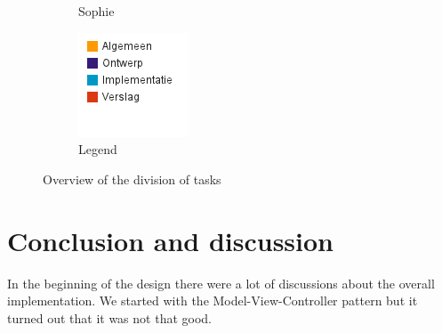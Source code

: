 \documentclass[i2]{oss}
\begin{document}
\begin{figure}[h!]
\begin{subfigure}[hb]{0.20\textwidth}
                \caption{Sophie}
        \end{subfigure}%
                \begin{subfigure}[hb]{0.20\textwidth}
                \centering
                \includegraphics[width=\textwidth]{legende}
                \caption{Legend}
        \end{subfigure}%


 \caption{Overview of the division of tasks}
\label{fig:werkverdeling}
\end{figure}





\section{Conclusion and discussion}
\label{ssec:conclusion}



In the beginning of the design there were a lot of discussions about the overall implementation. We started with the Model-View-Controller pattern but it turned out that it was not that good. \\
\end{document}
